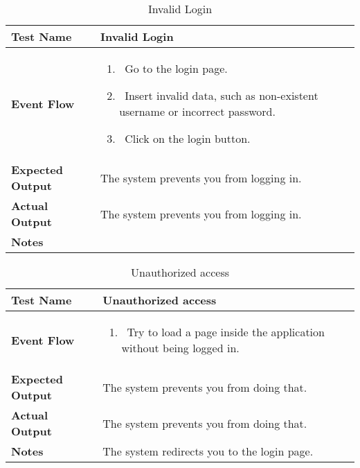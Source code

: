 \begin{table}[h]	
\centering
\def\arraystretch{1.5}
\begin{tabular}{|m{7cm}|m{7cm}|}
	\hline
	\textbf{Test Name}            &  Invalid Login  \\ \hline
	\textbf{Event Flow}             &  
		\begin{enumerate}
				\item~Go to the login page.
				\item~Insert invalid data, such as non-existent username or incorrect password.
				\item~Click on the login button.
		\end{enumerate}
		 \\ \hline
	\textbf{Expected Output}  &  The system prevents you from logging in.  \\ \hline
	\textbf{Actual Output}       &  The system prevents you from logging in.   \\ \hline
	\textbf{Notes} & \\ \hline
\end{tabular}
\caption{Invalid Login}
\end{table}


\begin{table}[h]	
	\centering
	\def\arraystretch{1.5}
	\begin{tabular}{|m{7cm}|m{7cm}|}
		\hline
		\textbf{Test Name}            &  Unauthorized access  \\ \hline
		\textbf{Event Flow}             &  
		\begin{enumerate}
			\item~Try to load a page inside the application without being logged in.
		\end{enumerate}
		\\ \hline
		\textbf{Expected Output}  &  The system prevents you from doing that.   \\ \hline
		\textbf{Actual Output}       &  The system prevents you from doing that.   \\ \hline
		\textbf{Notes} & The system redirects you to the login page. \\ \hline
	\end{tabular}
	\caption{Unauthorized access}
\end{table}


